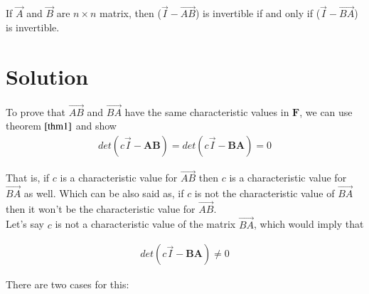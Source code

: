 \documentclass[journal,12pt,twocolumn]{IEEEtran}
\begin{document}
	\begin{theorem}\label{thm2}
		If $\vec{A}$ and $\vec{B}$ are $n\times n$ matrix, then ($\vec{I}-\vec{AB}$) is invertible if and only if ($\vec{I}-\vec{BA}$) is invertible. 
	\end{theorem}
	    
	\section{Solution}
	
	To prove that $\vec{AB}$ and $\vec{BA}$ have the same characteristic values in $\mathbf{F}$, we can use theorem $\ref{thm1}$ and show
	\begin{align}\label{eq1}
		det\left(c\vec{I}-\mathbf{AB}\right) = det\left(c\vec{I}-\mathbf{BA}\right) = 0
	\end{align}
	
	That is, if $c$ is a characteristic value for $\vec{AB}$ then $c$ is a characteristic value for $\vec{BA}$ as well. Which can be also said as, if $c$ is not the characteristic value of $\vec{BA}$ then it won't be the characteristic value for $\vec{AB}$. \\
	
	Let's say $c$ is not a characteristic value of the matrix $\vec{BA}$, which would imply that 
	
	\begin{align}\label{eq1}
		det(c\vec{I}-\mathbf{BA}) \neq 0
	\end{align}
	
	There are two cases for this:
	
\end{document}
